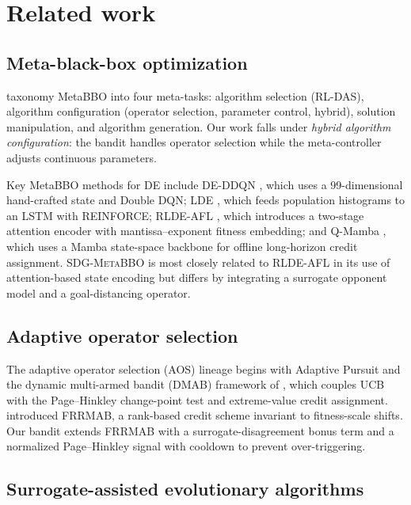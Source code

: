 \documentclass[preprint,12pt,authoryear]{elsarticle}
\newcommand{\sdg}{\textsc{SDG-MetaBBO}}
\begin{document}
\section{Related work}
\label{sec:related}

\subsection{Meta-black-box optimization}

\citet{Ma2025survey} taxonomy MetaBBO into four meta-tasks: algorithm selection (RL-DAS), algorithm configuration (operator selection, parameter control, hybrid), solution manipulation, and algorithm generation. Our work falls under \emph{hybrid algorithm configuration}: the bandit handles operator selection while the meta-controller adjusts continuous parameters.

Key MetaBBO methods for DE include DE-DDQN \citep{Sharma2019}, which uses a 99-dimensional hand-crafted state and Double DQN; LDE \citep{Sun2021}, which feeds population histograms to an LSTM with REINFORCE; RLDE-AFL \citep{Guo2025}, which introduces a two-stage attention encoder with mantissa--exponent fitness embedding; and Q-Mamba \citep{Ma2025qmamba}, which uses a Mamba state-space backbone for offline long-horizon credit assignment. \sdg{} is most closely related to RLDE-AFL in its use of attention-based state encoding but differs by integrating a surrogate opponent model and a goal-distancing operator.

\subsection{Adaptive operator selection}

The adaptive operator selection (AOS) lineage begins with Adaptive Pursuit \citep{Thierens2005} and the dynamic multi-armed bandit (DMAB) framework of \citet{Fialho2010}, which couples UCB with the Page--Hinkley change-point test and extreme-value credit assignment. \citet{Li2014} introduced FRRMAB, a rank-based credit scheme invariant to fitness-scale shifts. Our bandit extends FRRMAB with a surrogate-disagreement bonus term and a normalized Page--Hinkley signal with cooldown to prevent over-triggering.

\subsection{Surrogate-assisted evolutionary algorithms}
\end{document}
